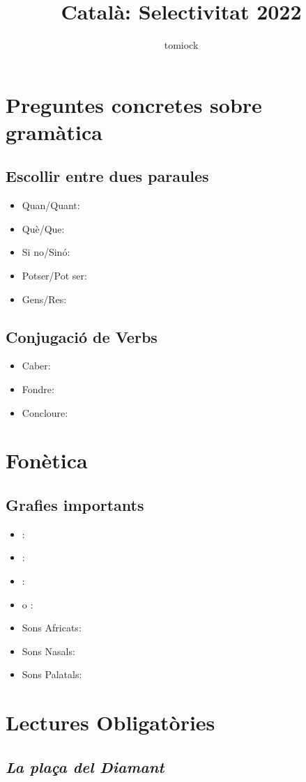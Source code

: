 \documentclass[arial,a4paper,print]{article}
\title{Català: Selectivitat 2022}
\author{tomiock}
\begin{document}
\maketitle

\section{Preguntes concretes sobre gramàtica}

\subsection{Escollir entre dues paraules}
\begin{itemize}
\item Quan/Quant: 
\item Què/Que: 
\item Si no/Sinó: 
\item Potser/Pot ser:
\item Gens/Res:


	
\end{itemize}

\subsection{Conjugació de Verbs}
\begin{itemize}
\item Caber:
\item Fondre:
\item Concloure:



\end{itemize}

\section{Fonètica}
\subsection{Grafies importants}
\begin{itemize}

\item \textipa{[z]}: 
\item \textipa{[s]}: 
\item \textipa{[tS]}: 
\item \textipa{[Z]} o \textipa{[dZ]}: 
\item Sons Africats: 
\item Sons Nasals: 
\item Sons Palatals: 

\end{itemize}

\section{Lectures Obligatòries}

\subsection{\textit{La plaça del Diamant}}


	
\end{document}
